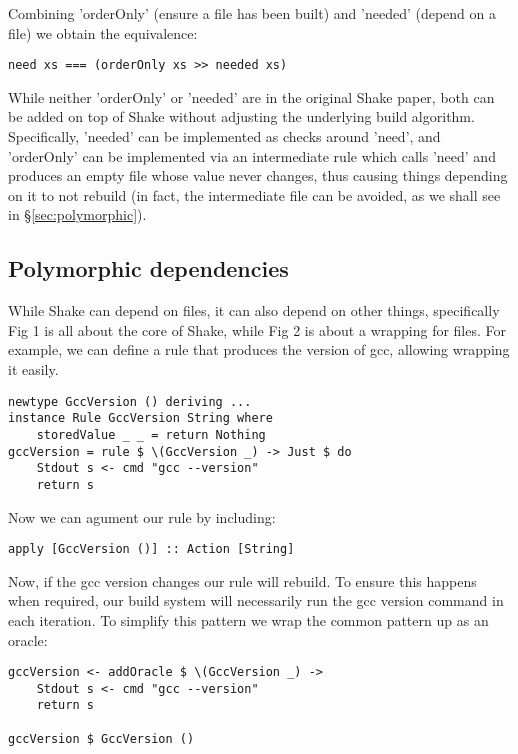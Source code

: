 Combining \lst'orderOnly' (ensure a file has been built) and \lst'needed' (depend on a file) we obtain the equivalence:

\begin{lstlisting}
need xs === (orderOnly xs >> needed xs)
\end{lstlisting}

While neither \lst'orderOnly' or \lst'needed' are in the original Shake paper, both can be added on top of Shake without adjusting the underlying build algorithm. Specifically, \lst'needed' can be implemented as checks around \lst'need', and \lst'orderOnly' can be implemented via an intermediate rule which calls \lst'need' and produces an empty file whose value never changes, thus causing things depending on it to not  rebuild (in fact, the intermediate file can be avoided, as we shall see in \S\ref{sec:polymorphic}).

\subsection{Polymorphic dependencies\label{sec:polymorphic}}

While Shake can depend on files, it can also depend on other things, specifically Fig 1 is all about the core of Shake, while Fig 2 is about a wrapping for files. For example, we can define a rule that produces the version of gcc, allowing wrapping it easily.

\begin{lstlisting}
newtype GccVersion () deriving ...
instance Rule GccVersion String where
    storedValue _ _ = return Nothing
gccVersion = rule $ \(GccVersion _) -> Just $ do
    Stdout s <- cmd "gcc --version"
    return s
\end{lstlisting}

Now we can agument our rule by including:

\begin{lstlisting}
apply [GccVersion ()] :: Action [String]
\end{lstlisting}

Now, if the gcc version changes our rule will rebuild. To ensure this happens when required, our build system will necessarily run the gcc version command in each iteration. To simplify this pattern we wrap the common pattern up as an oracle:

\begin{lstlisting}
gccVersion <- addOracle $ \(GccVersion _) ->
    Stdout s <- cmd "gcc --version"
    return s

gccVersion $ GccVersion ()
\end{lstlisting}


